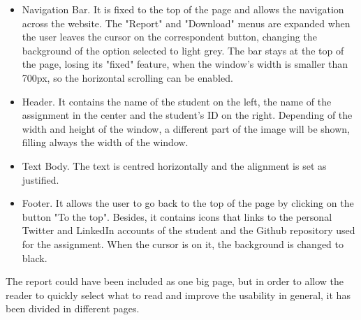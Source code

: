 \begin{itemize}
	\item Navigation Bar. It is fixed to the top of the page and allows the navigation across the website. The "Report" and "Download" menus are expanded when the user leaves the cursor on the correspondent button, changing the background of the option selected to light grey. The bar stays at the top of the page, losing its "fixed" feature, when the window's width is smaller than 700px, so the horizontal scrolling can be enabled.
	\item Header. It contains the name of the student on the left, the name of the assignment in the center and the student's ID on the right. Depending of the width and height of the window, a different part of the image will be shown, filling always the width of the window.
	\item Text Body. The text is centred horizontally and the alignment is set as justified.
	\item Footer. It allows the user to go back to the top of the page by clicking on the button "To the top". Besides, it contains icons that links to the personal Twitter and LinkedIn accounts of the student and the Github repository used for the assignment. When the cursor is on it, the background is changed to black.
\end{itemize}

The report could have been included as one big page, but in order to allow the reader to quickly select what to read and improve the usability in general, it has been divided in different pages.

